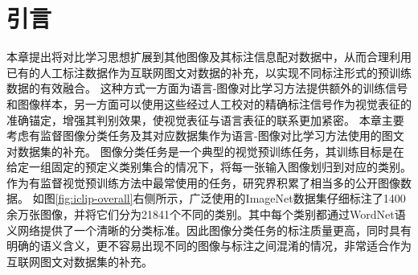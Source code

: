 \section{引言}
本章提出将对比学习思想扩展到其他图像及其标注信息配对数据中，从而合理利用已有的人工标注数据作为互联网图文对数据的补充，以实现不同标注形式的预训练数据的有效融合。
这种方式一方面为语言-图像对比学习方法提供额外的训练信号和图像样本，另一方面可以使用这些经过人工校对的精确标注信号作为视觉表征的准确锚定，增强其判别效果，使视觉表征与语言表征的联系更加紧密。
本章主要考虑有监督图像分类任务及其对应数据集作为语言-图像对比学习方法使用的图文对数据集的补充。
图像分类任务是一个典型的视觉预训练任务，其训练目标是在给定一组固定的预定义类别集合的情况下，将每一张输入图像划归到对应的类别。
作为有监督视觉预训练方法中最常使用的任务，研究界积累了相当多的公开图像数据。
如图\ref{fig:iclip-overall}右侧所示，广泛使用的ImageNet数据集\cite{deng2009imagenet}仔细标注了1400余万张图像，并将它们分为21841个不同的类别。其中每个类别都通过WordNet\cite{miller1995wordnet}语义网络提供了一个清晰的分类标准。因此图像分类任务的标注质量更高，同时具有明确的语义含义，更不容易出现不同的图像与标注之间混淆的情况，非常适合作为互联网图文对数据集的补充。


